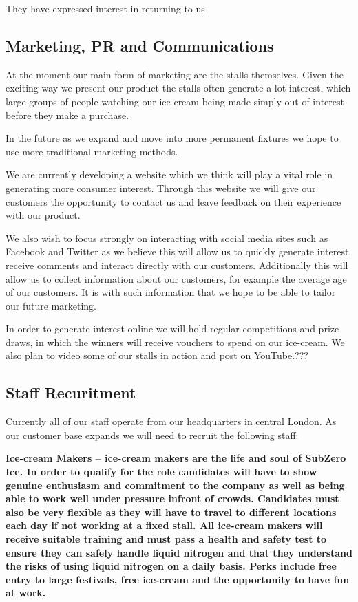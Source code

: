 \documentclass{article}
\begin{document}
  They have expressed interest in returning to us

  \subsection{Marketing, PR and Communications}
  At the moment our main form of marketing are the stalls themselves. Given the exciting way we present our product the stalls often generate a lot interest, which large groups of people watching our ice-cream being made simply out of interest before they make a purchase.

  In the future as we expand and move into more permanent fixtures we hope to use more traditional marketing methods.

  We are currently developing a website which we think will play a vital role in generating more consumer interest. Through this website we will give our customers the opportunity to contact us and leave feedback on their experience with our product.

  We also wish to focus strongly on interacting with social media sites such as Facebook and Twitter as we believe this will allow us to quickly generate interest, receive comments and interact directly with our customers. Additionally this will allow us to collect information about our customers, for example the average age of our customers. It is with such information that we hope to be able to tailor our future marketing.

  In order to generate interest online we will hold regular competitions and prize draws, in which the winners will receive vouchers to spend on our ice-cream. We also plan to video some of our stalls in action and post on YouTube.???

  \subsection{Staff Recuritment}

  Currently all of our staff operate from our headquarters in central London. As our customer base expands we will need to recruit the following staff:

 \bf{Ice-cream Makers} – ice-cream makers are the life and soul of SubZero Ice. In order to qualify for the role candidates will have to show genuine enthusiasm and commitment to the company as well as being able to work well under pressure infront of crowds. Candidates must also be very flexible as they will have to travel to different locations each day if not working at a fixed stall. All ice-cream makers will receive suitable training and must pass a health and safety test to ensure they can safely handle liquid nitrogen and that they understand the risks of using liquid nitrogen on a daily basis. Perks include free entry to large festivals, free ice-cream and the opportunity to have fun at work.
\end{document}
